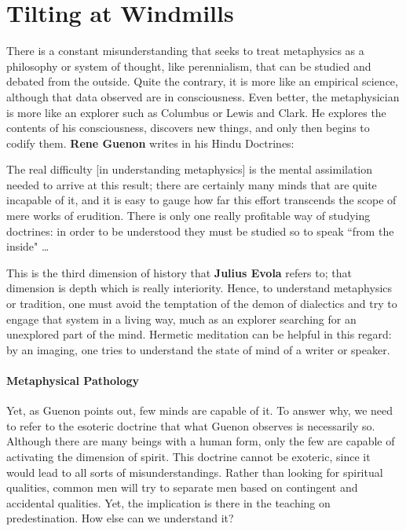 \section{Tilting at Windmills}

There is a constant misunderstanding that seeks to treat metaphysics as a philosophy or system of thought, like perennialism, that can be studied and debated from the outside. Quite the contrary, it is more like an empirical science, although that data observed are in consciousness. Even better, the metaphysician is more like an explorer such as Columbus or Lewis and Clark. He explores the contents of his consciousness, discovers new things, and only then begins to codify them. \textbf{Rene Guenon} writes in his Hindu Doctrines:

\begin{quotex}
The real difficulty [in understanding metaphysics] is the mental assimilation needed to arrive at this result; there are certainly many minds that are quite incapable of it, and it is easy to gauge how far this effort transcends the scope of mere works of erudition. There is only one really profitable way of studying doctrines: in order to be understood they must be studied so to speak ``from the inside" …

\end{quotex}
This is the third dimension of history that \textbf{Julius Evola} refers to; that dimension is depth which is really interiority. Hence, to understand metaphysics or tradition, one must avoid the temptation of the demon of dialectics and try to engage that system in a living way, much as an explorer searching for an unexplored part of the mind. Hermetic meditation can be helpful in this regard: by an imaging, one tries to understand the state of mind of a writer or speaker.

\paragraph{Metaphysical Pathology}


Yet, as Guenon points out, few minds are capable of it. To answer why, we need to refer to the esoteric doctrine that what Guenon observes is necessarily so. Although there are many beings with a human form, only the few are capable of activating the dimension of spirit. This doctrine cannot be exoteric, since it would lead to all sorts of misunderstandings. Rather than looking for spiritual qualities, common men will try to separate men based on contingent and accidental qualities. Yet, the implication is there in the teaching on predestination. How else can we understand it?

